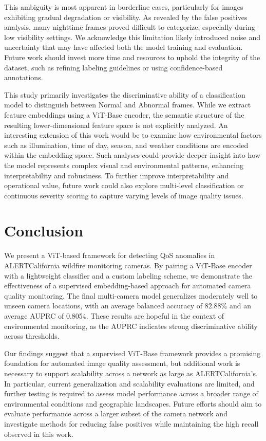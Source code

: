 \documentclass{article}
\begin{document}
This ambiguity is most apparent in borderline cases, particularly for images exhibiting gradual degradation or visibility. As revealed by the false positives analysis, many nighttime frames proved difficult to categorize, especially during low visibility settings. We acknowledge this limitation likely introduced noise and uncertainty that may have affected both the model training and evaluation. Future work should invest more time and resources to uphold the integrity of the dataset, such as refining labeling guidelines or using confidence-based annotations. 

This study primarily investigates the discriminative ability of a classification model to distinguish between Normal and Abnormal frames. While we extract feature embeddings using a \ac{ViT}-Base encoder, the semantic structure of the resulting lower-dimensional feature space is not explicitly analyzed. An interesting extension of this work would be to examine how environmental factors such as illumination, time of day, season, and weather conditions are encoded within the embedding space. Such analyses could provide deeper insight into how the model represents complex visual and environmental patterns, enhancing interpretability and robustness. To further improve interpretability and operational value, future work could also explore multi-level classification or continuous severity scoring to capture varying levels of image quality issues. 

\section{Conclusion}

We present a \ac{ViT}-based framework for detecting \ac{QoS} anomalies in ALERTCalifornia wildfire monitoring cameras. By pairing a \ac{ViT}-Base encoder with a lightweight classifier and a custom labeling scheme, we demonstrate the effectiveness of a supervised embedding-based approach for automated camera quality monitoring. The final multi-camera model generalizes moderately well to unseen camera locations, with an average balanced accuracy of $82.88\%$ and an average \ac{AUPRC} of 0.8054. These results are hopeful in the context of environmental monitoring, as the \ac{AUPRC} indicates strong discriminative ability across thresholds.

Our findings suggest that a supervised \ac{ViT}-Base framework provides a promising foundation for automated image quality assessment, but additional work is necessary to support scalability across a network as large as ALERTCalifornia's. In particular, current generalization and scalability evaluations are limited, and further testing is required to assess model performance across a broader range of environmental conditions and geographic landscapes. Future efforts should aim to evaluate performance across a larger subset of the camera network and investigate methods for reducing false positives while maintaining the high recall observed in this work. 
\end{document}
